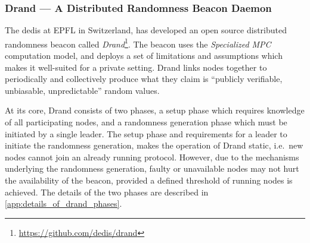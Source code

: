 \subsubsection{Drand --- A Distributed Randomness Beacon Daemon}%
\label{sub:drand_a_distributed_randomness_beacon_daemon}
The \gls{dedis} at EPFL in Switzerland, has developed an open source distributed randomness beacon called \textit{Drand}\footnote{\url{https://github.com/dedis/drand}}.
The beacon uses the \textit{Specialized MPC} computation model, and deploys a set of limitations and assumptions which makes it well-suited for a private setting.
Drand links nodes together to periodically and collectively produce what they claim is \enquote{publicly verifiable, unbiasable, unpredictable} random values.

At its core, Drand consists of two phases, a setup phase which requires knowledge of all participating nodes, and a randomness generation phase which must be initiated by a single leader.
The setup phase and requirements for a leader to initiate the randomness generation, makes the operation of Drand static, i.e.\ new nodes cannot join an already running protocol.
However, due to the mechanisms underlying the randomness generation, faulty or unavailable nodes may not hurt the availability of the beacon, provided a defined threshold of running nodes is achieved.
The details of the two phases are described in \vref{app:details_of_drand_phases}. 
